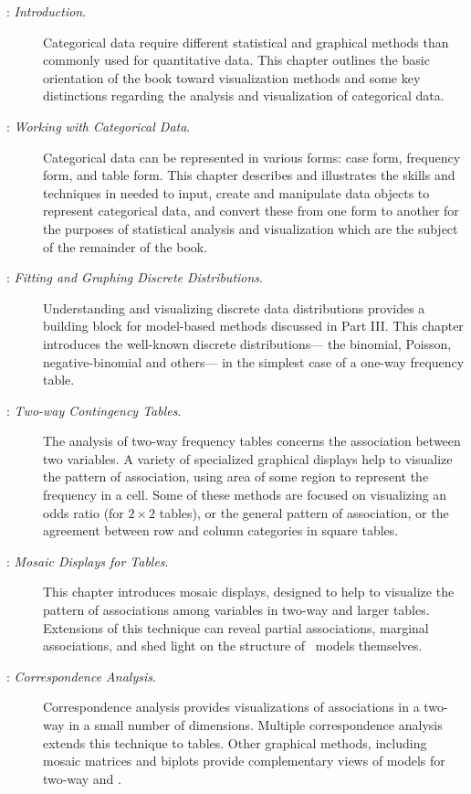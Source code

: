 \begin{description}
\item[: \emph{Introduction}.]
Categorical data require different statistical and graphical methods
than commonly used for quantitative data.
This chapter outlines the basic orientation
of the book toward visualization methods and some key distinctions regarding the
analysis and visualization of categorical data.

\item[: \emph{Working with Categorical Data}.]
Categorical data can be represented in various forms:
case form, frequency form, and table form.  This chapter
describes and illustrates the skills and techniques in \R
needed to input, create and manipulate \R data objects
to represent categorical data, and convert these from one
form to another for the purposes of statistical analysis
and visualization which are the subject of the remainder of the book.

\item[: \emph{Fitting and Graphing Discrete Distributions}.]
Understanding and visualizing discrete data distributions provides a
building block for model-based methods discussed in Part III.
This chapter introduces the well-known discrete distributions---
the binomial, Poisson, negative-binomial and others---
in the simplest case of a one-way frequency table.

\item[: \emph{Two-way Contingency Tables}.]
The analysis of two-way frequency tables concerns the association
between two variables.  A variety of specialized graphical
displays help to visualize the pattern of association,
using area of some region to represent the frequency in a cell.
Some of these methods are focused
on visualizing an odds ratio (for $2 \times 2$ tables), or the general
pattern of association, or the agreement between row and column
categories in square tables.

\item[: \emph{Mosaic Displays for \nway Tables}.]
This chapter introduces mosaic displays, designed to
help to visualize the pattern of associations
among variables in two-way and larger tables.  
Extensions of
this technique can reveal partial associations, marginal associations,
and shed light on the structure of \loglin\ models themselves.

\item[: \emph{Correspondence Analysis}.]
Correspondence analysis provides visualizations of associations in a two-way \ctab
in a small number of dimensions.
Multiple correspondence analysis extends this technique to \nway
tables.  Other graphical methods, including mosaic matrices and biplots
provide complementary views of \loglin models for two-way and \nway
\ctabs.


\end{description}

